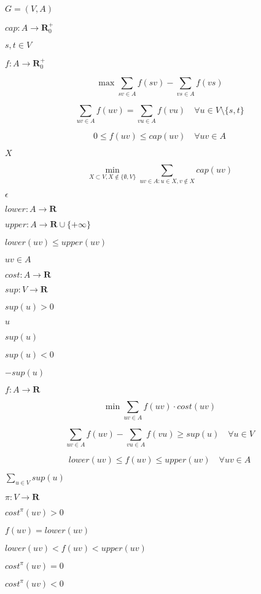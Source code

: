 \documentclass{article}
\begin{document}
$G=(V,A)$
\pagebreak

$cap: A\rightarrow\mathbf{R}^+_0$
\pagebreak

$s, t \in V$
\pagebreak

$f: A\rightarrow\mathbf{R}^+_0$
\pagebreak

\[ \max\sum_{sv\in A} f(sv) - \sum_{vs\in A} f(vs) \]
\pagebreak

\[ \sum_{uv\in A} f(uv) = \sum_{vu\in A} f(vu) \quad \forall u\in V\setminus\{s,t\} \]
\pagebreak

\[ 0 \leq f(uv) \leq cap(uv) \quad \forall uv\in A \]
\pagebreak

$X$
\pagebreak

\[ \min_{X \subset V, X\not\in \{\emptyset, V\}} \sum_{uv\in A: u\in X, v\not\in X}cap(uv) \]
\pagebreak

$\epsilon$
\pagebreak

$lower: A\rightarrow\mathbf{R}$
\pagebreak

$upper: A\rightarrow\mathbf{R}\cup\{+\infty\}$
\pagebreak

$lower(uv) \leq upper(uv)$
\pagebreak

$uv\in A$
\pagebreak

$cost: A\rightarrow\mathbf{R}$
\pagebreak

$sup: V\rightarrow\mathbf{R}$
\pagebreak

$sup(u)>0$
\pagebreak

$u$
\pagebreak

$sup(u)$
\pagebreak

$sup(u)<0$
\pagebreak

$-sup(u)$
\pagebreak

$f: A\rightarrow\mathbf{R}$
\pagebreak

\[ \min\sum_{uv\in A} f(uv) \cdot cost(uv) \]
\pagebreak

\[ \sum_{uv\in A} f(uv) - \sum_{vu\in A} f(vu) \geq sup(u) \quad \forall u\in V \]
\pagebreak

\[ lower(uv) \leq f(uv) \leq upper(uv) \quad \forall uv\in A \]
\pagebreak

$\sum_{u\in V} sup(u)$
\pagebreak

$\pi: V\rightarrow\mathbf{R}$
\pagebreak

$cost^\pi(uv)>0$
\pagebreak

$f(uv)=lower(uv)$
\pagebreak

$lower(uv)<f(uv)<upper(uv)$
\pagebreak

$cost^\pi(uv)=0$
\pagebreak

$cost^\pi(uv)<0$
\pagebreak
\end{document}
